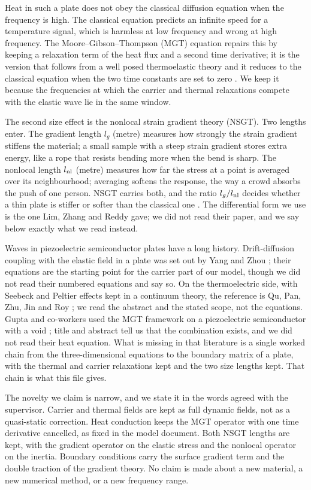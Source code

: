 \documentclass[11pt,a4paper]{article}
\begin{document}
Heat in such a plate does not obey the classical diffusion equation when the frequency is high. The
classical equation predicts an infinite speed for a temperature signal, which is harmless at low frequency
and wrong at high frequency. The Moore--Gibson--Thompson (MGT) equation repairs this by keeping a relaxation
term of the heat flux and a second time derivative; it is the version that follows from a well posed
thermoelastic theory and it reduces to the classical equation when the two time constants are set to zero
\cite{Quintanilla2019}. We keep it because the frequencies at which the carrier and thermal relaxations
compete with the elastic wave lie in the same window.

The second size effect is the nonlocal strain gradient theory (NSGT). Two lengths enter. The gradient length
$l_g$ (metre) measures how strongly the strain gradient stiffens the material; a small sample with a steep
strain gradient stores extra energy, like a rope that resists bending more when the bend is sharp. The
nonlocal length $l_{\rm nl}$ (metre) measures how far the stress at a point is averaged over its
neighbourhood; averaging softens the response, the way a crowd absorbs the push of one person. NSGT carries
both, and the ratio $l_g/l_{\rm nl}$ decides whether a thin plate is stiffer or softer than the classical
one \cite{Barretta2018}. The differential form we use is the one Lim, Zhang and Reddy gave; we did not read
their paper, and we say below exactly what we read instead.

Waves in piezoelectric semiconductor plates have a long history. Drift-diffusion coupling with the elastic
field in a plate was set out by Yang and Zhou \cite{YangZhou2005}; their equations are the starting point
for the carrier part of our model, though we did not read their numbered equations and say so. On the
thermoelectric side, with Seebeck and Peltier effects kept in a continuum theory, the reference is Qu, Pan,
Zhu, Jin and Roy \cite{Qu2023}; we read the abstract and the stated scope, not the equations. Gupta and
co-workers used the MGT framework on a piezoelectric semiconductor with a void \cite{Gupta2025}; title and
abstract tell us that the combination exists, and we did not read their heat equation. What is missing in that literature is a single worked chain from the three-dimensional
equations to the boundary matrix of a plate, with the thermal and carrier relaxations kept and the two size
lengths kept. That chain is what this file gives.

The novelty we claim is narrow, and we state it in the words agreed with the supervisor. Carrier and thermal
fields are kept as full dynamic fields, not as a quasi-static correction. Heat conduction keeps the MGT
operator with one time derivative cancelled, as fixed in the model document. Both NSGT lengths are kept,
with the gradient operator on the elastic stress and the nonlocal operator on the inertia. Boundary
conditions carry the surface gradient term and the double traction of the gradient theory. No claim is made
about a new material, a new numerical method, or a new frequency range.
\end{document}
